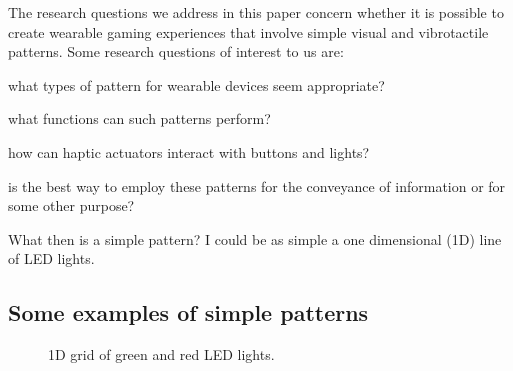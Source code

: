 \documentclass{chi-ext}
\begin{document}
The research questions we address in this paper concern whether it is possible to create wearable gaming experiences that involve simple visual and vibrotactile patterns. Some  research questions of interest to us are:
\begin{inparaenum}
\item what types of pattern for wearable devices seem appropriate?
\item what functions can such patterns perform?
\item how can haptic actuators interact with buttons and lights?
\item is the best way to employ these patterns for the conveyance of information or for some other purpose?
\end{inparaenum}

What then is a simple pattern? I could be as simple a one dimensional (1D) line of LED lights. 

\subsection{Some examples of simple patterns}
\bigskip
\begin{figure}
  	\begin{center}
  	\caption{1D grid of green and red LED lights.}
  	\label{fig:1D}
    	\end{center}
\end{figure}
\end{document}

